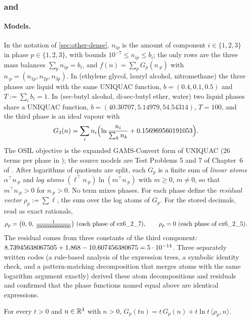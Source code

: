 \subsubsection{ and }\label{app:small-ex62}

\paragraph{Models.}
In the notation of \cref{sec:other-dense}, $n_{ip}$ is the amount of component $i\in\{1,2,3\}$ in phase $p\in\{1,2,3\}$, with bounds $10^{-7}\le n_{ip}\le b_i$; the only rows are the three mass balances $\sum_p n_{ip}=b_i$, and $f(n)=\sum_{p}G_p(n_{\cdot p})$ with $n_{\cdot p}=(n_{1p},n_{2p},n_{3p})$.
In  (ethylene glycol, lauryl alcohol, nitromethane) the three phases are liquid with the same UNIQUAC function, $b=(0.4,0.1,0.5)$ and $T:=\sum_ib_i=1$.
In  (sec-butyl alcohol, di-sec-butyl ether, water) two liquid phases share a UNIQUAC function, $b=(40.30707,5.14979,54.54314)$, $T=100$, and the third phase is an ideal vapour with
\[
G_3(n)=\sum_i n_i\Bigl(\ln\frac{n_i}{\sum_k n_k}+0.156969560191053\Bigr).
\]
The OSIL objective is the expanded GAMS-Convert form of UNIQUAC (26 terms per phase in ); the source models are Test Problems 5 and 7 of Chapter~6 of \citet{floudas1999-handbook-of-test-problems-in}.
After logarithms of quotients are split, each $G_p$ is a finite sum of \emph{linear atoms} $\alpha^\top n_{\cdot p}$
and \emph{log atoms} $(\ell^\top n_{\cdot p})\ln(m^\top n_{\cdot p})$ with $m\ge0$, $m\neq0$, so that $m^\top n_{\cdot p}>0$ for $n_{\cdot p}>0$.
No term mixes phases.
For each phase define the \emph{residual vector} $\rho_p:=\sum\ell$, the sum over the log atoms of $G_p$.
For the stored decimals, read as exact rationals,
\[
\rho_p=\bigl(0,\,0,\,\tfrac{1}{20000000000000}\bigr)\ \text{(each phase of \inst{ex6_2_7})},\qquad \rho_p=0\ \text{(each phase of \inst{ex6_2_5})}.
\]
The  residual comes from three constants of the third component:
$8.73945638067505+1.868-10.607456380675=5\cdot 10^{-14}$.
Three separately written codes (a rule-based analysis of the expression trees, a symbolic identity check, and a pattern-matching decomposition that merges atoms with the same logarithm argument exactly) derived these atom decompositions and residuals and confirmed that the phase functions named equal above are identical expressions.

\begin{lemma}\label{lem:ex62-scaling}
For every $t>0$ and $n\in\mathbb{R}^3$ with $n>0$, $G_p(tn)=t\,G_p(n)+t\ln t\,\langle \rho_p,n\rangle$.
\end{lemma}

